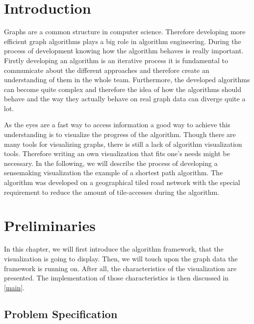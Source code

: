 \documentclass
[
    paper = a4,
    pagesize,
    12 pt,
    oneside,                       %
    open = right,
    DIV = calc,
    BCOR = 0 mm,                   %
    bibtotoc
]
{scrbook}
\begin{document}
\frontmatter







\mainmatter
\chapter{Introduction} \label{introduction}
Graphs are a common structure in computer science.
Therefore developing more efficient graph algorithms plays a big role in algorithm engineering.
During the process of development knowing how the algorithm behaves is really important.
Firstly developing an algorithm is an iterative process it is fundamental to communicate about the different approaches and therefore create an understanding of them in the whole team.
Furthermore, the developed algorithms can become quite complex and therefore the idea of how the algorithms should behave and the way they actually behave on real graph data can diverge quite a lot.
\par
As the eyes are a fast way to access information a good way to achieve this understanding is to visualize the progress of the algorithm.
Though there are many tools for visualizing graphs, there is still a lack of algorithm visualization tools.
Therefore writing an own visualization that fits one's needs might be necessary.
In the following, we will describe the process of developing a sensemaking visualization the example of a shortest path algorithm. The algorithm was developed on a geographical tiled road network with the special requirement to reduce the amount of tile-accesses during the algorithm.


\chapter{Preliminaries} \label{questions}

In this chapter, we will first introduce the algorithm framework, that the visualization is going to display.
Then, we will touch upon the graph data the framework is running on.
After all, the characteristics of the visualization are presented.
The implementation of those characteristics is then discussed in \cref{main}.


\section{Problem Specification} \label{specification}
\end{document}
